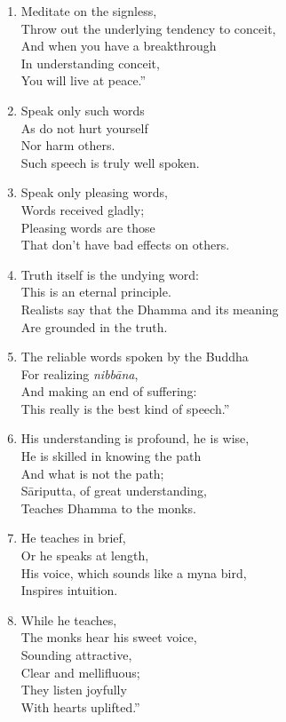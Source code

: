 \documentclass[10pt, openany]{book}
\newcommand*{\vleftofline}[1]{\leavevmode\llap{#1}}
\begin{document}
\begin{enumerate}
\item Meditate on the signless,\\
Throw out the underlying tendency to conceit,\\
And when you have a breakthrough \\
In understanding conceit,\\
You will live at peace.”

\item \vleftofline{“}Speak only such words\\
As do not hurt yourself\\
Nor harm others.\\
Such speech is truly well spoken.

\item Speak only pleasing words,\\
Words received gladly;\\
Pleasing words are those\\
That don’t have bad effects on others.

\item Truth itself is the undying word:\\
This is an eternal principle.\\
Realists say that the Dhamma and its meaning\\
Are grounded in the truth.

\item The reliable words spoken by the Buddha\\
For realizing \emph{nibbāna},\\
And making an end of suffering:\\
This really is the best kind of speech.”

\item \vleftofline{“}His understanding is profound, he is wise,\\
He is skilled in knowing the path \\
And what is not the path;\\
Sāriputta, of great understanding,\\
Teaches Dhamma to the monks.

\item He teaches in brief,\\
Or he speaks at length,\\
His voice, which sounds like a myna bird,\\
Inspires intuition.

\item While he teaches,\\
The monks hear his sweet voice,\\
Sounding attractive,\\
Clear and mellifluous;\\
They listen joyfully\\
With hearts uplifted.”


\end{enumerate}
\end{document}
